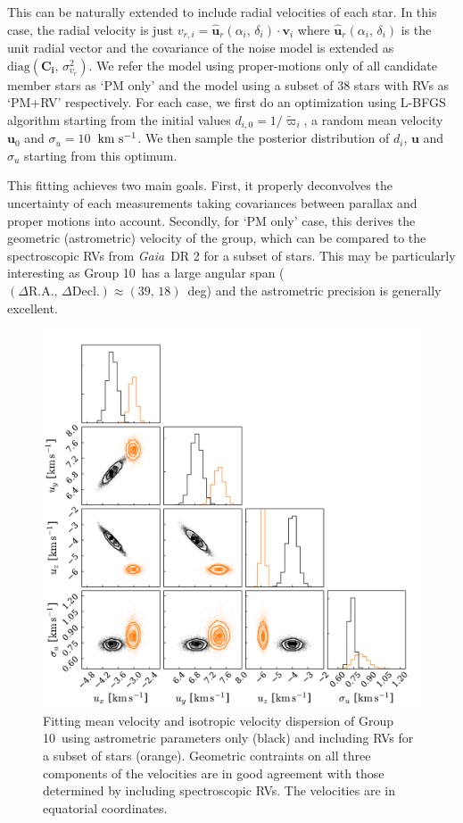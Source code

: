 \documentclass[modern,letterpaper]{aastex61}
\newcommand{\project}[1]{\textsl{#1}}
\newcommand{\gaia}{\project{Gaia}}
\newcommand{\groupTen}{Group 10}
\newcommand{\bs}[1]{\boldsymbol{#1}}
\newcommand{\mat}[1]{\mathbf{#1}}
\renewcommand{\vec}[1]{\bs{#1}}
\newcommand{\kms}{\ensuremath{\rm km~s^{-1}}}
\begin{document}
This can be naturally extended to include radial velocities of each star.
In this case, the radial velocity is just $v_{r,i} =
\hat{\vec{u}}_r(\alpha_i,\,\delta_i) \cdot \vec{v}_i$
where $\hat{\vec{u}}_r(\alpha_i,\,\delta_i)$ is the unit radial vector
and the covariance of the noise model
is extended as $\mathrm{diag}(\mat{C_i},\,\sigma_{v_r}^2)$.
We refer the model using proper-motions only of all candidate member stars as `PM only'
and the model using a subset of 38 stars with RVs as `PM+RV' respectively.
For each case, we first do an optimization using L-BFGS algorithm starting from
the initial values $d_{i,0} = 1/{\tilde \varpi_i}$, a random mean velocity
$\vec{u}_0$ and $\sigma_u=10$~\kms.
We then sample the posterior distribution of $d_i$, $\vec{u}$ and $\sigma_u$
starting from this optimum.

This fitting achieves two main goals.
First, it properly deconvolves the uncertainty of each measurements taking
covariances between parallax and proper motions into account.
Secondly, for `PM only' case, this derives the geometric (astrometric) velocity
of the group, which can be compared to the spectroscopic RVs from \gaia\ DR 2
for a subset of stars.
This may be particularly interesting as \groupTen\ has a large angular span
($(\Delta\mathrm{R.A.},\,\Delta\mathrm{Decl.})\approx(39,\,18)$~deg)
and the astrometric precision is generally excellent.


\begin{figure}
  \includegraphics[width=0.95\linewidth]{isotropic.pdf}
  \caption{Fitting mean velocity and isotropic velocity dispersion of \groupTen\
    using astrometric parameters only (black) and including RVs for a subset
    of stars (orange).
    Geometric contraints on all three components of the velocities are in good
    agreement with those determined by including spectroscopic RVs.
    The velocities are in equatorial coordinates.
    }
  \label{fig:fit}
\end{figure}
\end{document}
